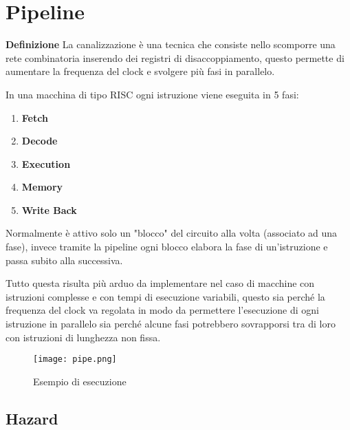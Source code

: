 \documentclass{article}
\begin{document}
\newpage

\section{Pipeline}

\textbf{Definizione} La canalizzazione è una tecnica che consiste nello scomporre una rete combinatoria inserendo dei registri di disaccoppiamento, questo permette di aumentare la frequenza del clock e svolgere più fasi in parallelo.\newline

\noindent In una macchina di tipo RISC ogni istruzione viene eseguita in 5 fasi:
\begin{enumerate}
    \item \textbf{Fetch}
    \item \textbf{Decode}
    \item \textbf{Execution}
    \item \textbf{Memory}
    \item \textbf{Write Back}
\end{enumerate}

\noindent Normalmente è attivo solo un "blocco" del circuito alla volta (associato ad una fase), invece tramite la pipeline ogni blocco elabora la fase di un'istruzione e passa subito alla successiva.\newline

\noindent Tutto questa risulta più arduo da implementare nel caso di macchine con istruzioni complesse e con tempi di esecuzione variabili, questo sia perché la frequenza del clock va regolata in modo da permettere l'esecuzione di ogni istruzione in parallelo sia perché alcune fasi potrebbero sovrapporsi tra di loro con istruzioni di lunghezza non fissa.\newline

\begin{figure}[ht]
    \centering
    \texttt{[image: pipe.png]}
    \caption{Esempio di esecuzione}
    \label{fig:pipe}
\end{figure}

\subsection{Hazard}
\end{document}
